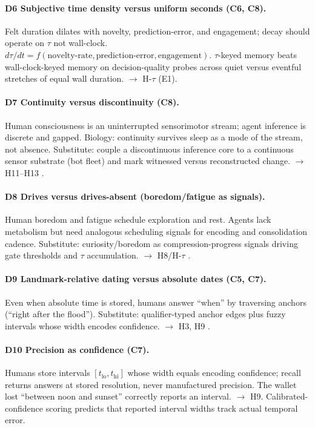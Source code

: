 \documentclass[letterpaper]{article}
\begin{document}
\paragraph{D6 Subjective time density versus uniform seconds (C6, C8).} Felt duration dilates with novelty, prediction-error, and engagement; decay should operate on $\tau$ not wall-clock. $d\tau/dt = f(\text{novelty-rate}, \text{prediction-error}, \text{engagement})$. $\tau$-keyed memory beats wall-clock-keyed memory on decision-quality probes across quiet versus eventful stretches of equal wall duration. $\to$ H-$\tau$ (E1).

\paragraph{D7 Continuity versus discontinuity (C8).} Human consciousness is an uninterrupted sensorimotor stream; agent inference is discrete and gapped. Biology: continuity survives sleep as a mode of the stream, not absence. Substitute: couple a discontinuous inference core to a continuous sensor substrate (bot fleet) and mark witnessed versus reconstructed change. $\to$ H11--H13 \citep{james1890principles,bergson1889duree}.

\paragraph{D8 Drives versus drives-absent (boredom/fatigue as signals).} Human boredom and fatigue schedule exploration and rest. Agents lack metabolism but need analogous scheduling signals for encoding and consolidation cadence. Substitute: curiosity/boredom as compression-progress signals driving gate thresholds and $\tau$ accumulation. $\to$ H8/H-$\tau$ \citep{schmidhuber1991curiosity}.

\paragraph{D9 Landmark-relative dating versus absolute dates (C5, C7).} Even when absolute time is stored, humans answer ``when'' by traversing anchors (``right after the flood''). Substitute: qualifier-typed anchor edges plus fuzzy intervals whose width encodes confidence. $\to$ H3, H9 \citep{gibbon1977scalar}.

\paragraph{D10 Precision as confidence (C7).} Humans store intervals $[t_{\text{lo}},t_{\text{hi}}]$ whose width equals encoding confidence; recall returns answers at stored resolution, never manufactured precision. The wallet lost ``between noon and sunset'' correctly reports an interval. $\to$ H9. Calibrated-confidence scoring predicts that reported interval widths track actual temporal error.
\end{document}
